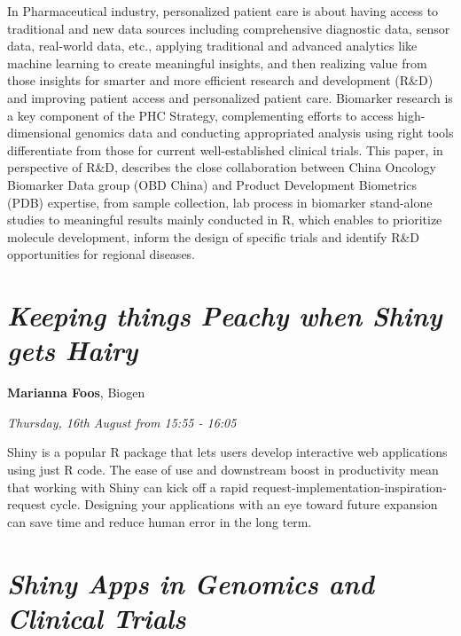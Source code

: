 \documentclass[]{book}
\theoremstyle{definition}
\theoremstyle{definition}
\theoremstyle{definition}
\theoremstyle{remark}
\begin{document}
In Pharmaceutical industry, personalized patient care is about having
access to traditional and new data sources including comprehensive
diagnostic data, sensor data, real-world data, etc., applying
traditional and advanced analytics like machine learning to create
meaningful insights, and then realizing value from those insights for
smarter and more efficient research and development (R\&D) and improving
patient access and personalized patient care. Biomarker research is a
key component of the PHC Strategy, complementing efforts to access
high-dimensional genomics data and conducting appropriated analysis
using right tools differentiate from those for current well-established
clinical trials. This paper, in perspective of R\&D, describes the close
collaboration between China Oncology Biomarker Data group (OBD China)
and Product Development Biometrics (PDB) expertise, from sample
collection, lab process in biomarker stand-alone studies to meaningful
results mainly conducted in R, which enables to prioritize molecule
development, inform the design of specific trials and identify R\&D
opportunities for regional diseases.

\hypertarget{keeping-things-peachy-when-shiny-gets-hairy-1}{%
\section{\texorpdfstring{\emph{Keeping things Peachy when Shiny gets
Hairy}}{Keeping things Peachy when Shiny gets Hairy}}\label{keeping-things-peachy-when-shiny-gets-hairy-1}}

\textbf{Marianna Foos}, Biogen

\emph{Thursday, 16th August from 15:55 - 16:05}

Shiny is a popular R package that lets users develop interactive web
applications using just R code. The ease of use and downstream boost in
productivity mean that working with Shiny can kick off a rapid
request-implementation-inspiration-request cycle. Designing your
applications with an eye toward future expansion can save time and
reduce human error in the long term.

\hypertarget{shiny-apps-in-genomics-and-clinical-trials-1}{%
\section{\texorpdfstring{\emph{Shiny Apps in Genomics and Clinical
Trials}}{Shiny Apps in Genomics and Clinical Trials}}\label{shiny-apps-in-genomics-and-clinical-trials-1}}
\end{document}
